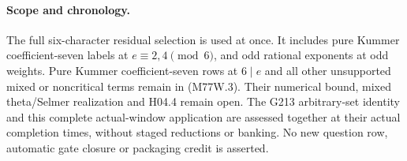 \paragraph{Scope and chronology.}
The full six-character residual selection is used at once.
It includes pure Kummer coefficient-seven labels at
$e\equiv2,4\pmod6$, and odd rational exponents at odd weights.
Pure Kummer coefficient-seven rows at $6\mid e$ and all other
unsupported mixed or noncritical terms remain in (M77W.3).
Their numerical bound, mixed theta/Selmer realization and H04.4
remain open. The G213 arbitrary-set identity and this complete
actual-window application are assessed together at their actual
completion times, without staged reductions or banking.
No new question row, automatic gate closure or packaging credit
is asserted.
